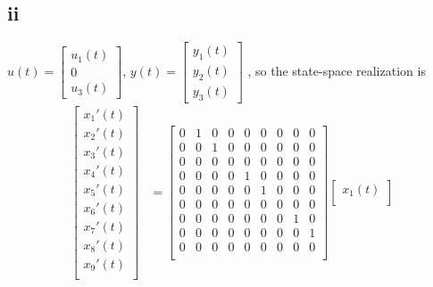 \documentclass[12pt,a4paper]{article}
\begin{document}
\subsection*{ii}
$u(t) = \begin{bmatrix}
    u_1(t)\\
    0 \\
    u_3(t)
\end{bmatrix}
$, $y(t) = \begin{bmatrix}
    y_1(t)\\
    y_2(t)\\
    y_3(t)
\end{bmatrix}
$
, so the state-space realization is
\[
    \begin{aligned}
        \begin{bmatrix}
            x_1'(t) \\
            x_2'(t) \\
            x_3'(t) \\
            x_4'(t) \\
            x_5'(t) \\
            x_6'(t) \\
            x_7'(t) \\
            x_8'(t) \\
            x_9'(t) \\
        \end{bmatrix} & = \begin{bmatrix}
                            0 & 1 & 0 & 0 & 0 & 0 & 0 & 0 & 0 \\
                            0 & 0 & 1 & 0 & 0 & 0 & 0 & 0 & 0 \\
                            0 & 0 & 0 & 0 & 0 & 0 & 0 & 0 & 0 \\
                            0 & 0 & 0 & 0 & 1 & 0 & 0 & 0 & 0 \\
                            0 & 0 & 0 & 0 & 0 & 1 & 0 & 0 & 0 \\
                            0 & 0 & 0 & 0 & 0 & 0 & 0 & 0 & 0 \\
                            0 & 0 & 0 & 0 & 0 & 0 & 0 & 1 & 0 \\
                            0 & 0 & 0 & 0 & 0 & 0 & 0 & 0 & 1 \\
                            0 & 0 & 0 & 0 & 0 & 0 & 0 & 0 & 0 \\
                        \end{bmatrix} \begin{bmatrix}
                                        x_1(t) \\

\end{bmatrix}
\end{aligned}\]
\end{document}
